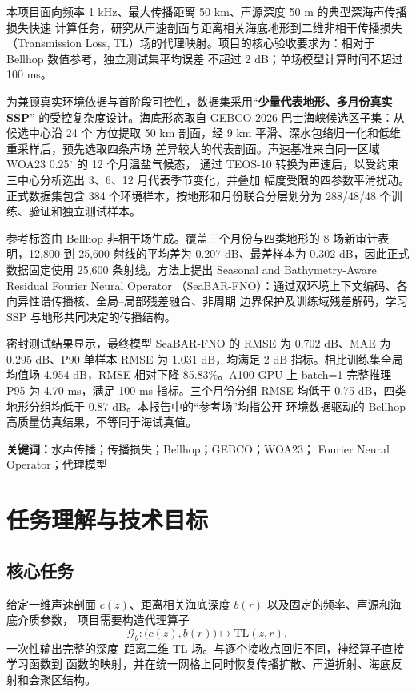 \documentclass[UTF8,11pt]{ctexart}
\newcommand{\TL}{\mathrm{TL}}
\newcommand{\BestModel}{SeaBAR-FNO}
\newcommand{\BestRMSE}{0.702}
\newcommand{\BestMAE}{0.295}
\newcommand{\BestPninety}{1.031}
\newcommand{\GlobalBaseline}{4.954}
\newcommand{\RelativeReduction}{85.83}
\newcommand{\GpuPninetyfive}{4.70}
\begin{document}
本项目面向频率 1 kHz、最大传播距离 50 km、声源深度 50 m 的典型深海声传播损失快速
计算任务，研究从声速剖面与距离相关海底地形到二维非相干传播损失（Transmission Loss,
TL）场的代理映射。项目的核心验收要求为：相对于 Bellhop 数值参考，独立测试集平均误差
不超过 2 dB；单场模型计算时间不超过 100 ms。

为兼顾真实环境依据与首阶段可控性，数据集采用“\textbf{少量代表地形、多月份真实 SSP}”
的受控复杂度设计。海底形态取自 GEBCO 2026 巴士海峡候选区子集：从候选中心沿 24 个
方位提取 50 km 剖面，经 9 km 平滑、深水包络归一化和低维重采样后，预先选取四条声场
差异较大的代表剖面。声速基准来自同一区域 WOA23 0.25$^\circ$ 的 12 个月温盐气候态，
通过 TEOS-10 转换为声速后，以受约束三中心分析选出 3、6、12 月代表季节变化，并叠加
幅度受限的四参数平滑扰动。正式数据集包含 384 个环境样本，按地形和月份联合分层划分为
288/48/48 个训练、验证和独立测试样本。

参考标签由 Bellhop 非相干场生成。覆盖三个月份与四类地形的 8 场新审计表明，12,800 到
25,600 射线的平均差为 0.207 dB、最差样本为 0.302 dB，因此正式数据固定使用 25,600
条射线。方法上提出 Seasonal and Bathymetry-Aware Residual Fourier Neural Operator
（SeaBAR-FNO）：通过双环境上下文编码、各向异性谱传播核、全局--局部残差融合、非周期
边界保护及训练域残差解码，学习 SSP 与地形共同决定的传播结构。

密封测试结果显示，最终模型 \BestModel{} 的 RMSE 为 \BestRMSE{} dB、MAE 为
\BestMAE{} dB、P90 单样本 RMSE 为 \BestPninety{} dB，均满足 2 dB 指标。相比训练集全局
均值场 \GlobalBaseline{} dB，RMSE 相对下降 \RelativeReduction{}\%。A100 GPU 上 batch=1
完整推理 P95 为 \GpuPninetyfive{} ms，满足 100 ms 指标。三个月份分组 RMSE 均低于
0.75 dB，四类地形分组均低于 0.87 dB。本报告中的“参考场”均指公开
环境数据驱动的 Bellhop 高质量仿真结果，不等同于海试真值。

\vspace{0.5cm}
\noindent\textbf{关键词：}水声传播；传播损失；Bellhop；GEBCO；WOA23；
Fourier Neural Operator；代理模型

\clearpage
\tableofcontents
\clearpage
{}

\section{任务理解与技术目标}

\subsection{核心任务}

给定一维声速剖面 $c(z)$、距离相关海底深度 $b(r)$ 以及固定的频率、声源和海底介质参数，
项目需要构造代理算子
\begin{equation}
  \mathcal{G}_\theta:\big(c(z),b(r)\big)\longmapsto \TL(z,r),
\end{equation}
一次性输出完整的深度--距离二维 TL 场。与逐个接收点回归不同，神经算子直接学习函数到
函数的映射，并在统一网格上同时恢复传播扩散、声道折射、海底反射和会聚区结构。
\end{document}

